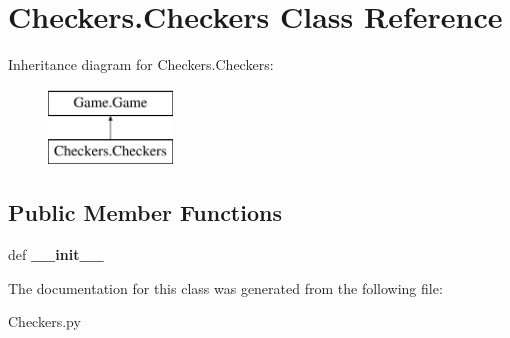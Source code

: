 \hypertarget{classCheckers_1_1Checkers}{\section{\-Checkers.\-Checkers \-Class \-Reference}
\label{classCheckers_1_1Checkers}
}
\-Inheritance diagram for \-Checkers.\-Checkers\-:\begin{figure}[H]
\begin{center}
\leavevmode
\includegraphics[height=2.000000cm]{classCheckers_1_1Checkers}
\end{center}
\end{figure}
\subsection*{\-Public \-Member \-Functions}
\begin{DoxyCompactItemize}
\item 
\hypertarget{classCheckers_1_1Checkers_a05e26c998f8bc7f323e09f79a1937c17}{def {\bfseries \-\_\-\-\_\-init\-\_\-\-\_\-}}\label{classCheckers_1_1Checkers_a05e26c998f8bc7f323e09f79a1937c17}

\end{DoxyCompactItemize}


\-The documentation for this class was generated from the following file\-:\begin{DoxyCompactItemize}
\item 
\-Checkers.\-py\end{DoxyCompactItemize}
